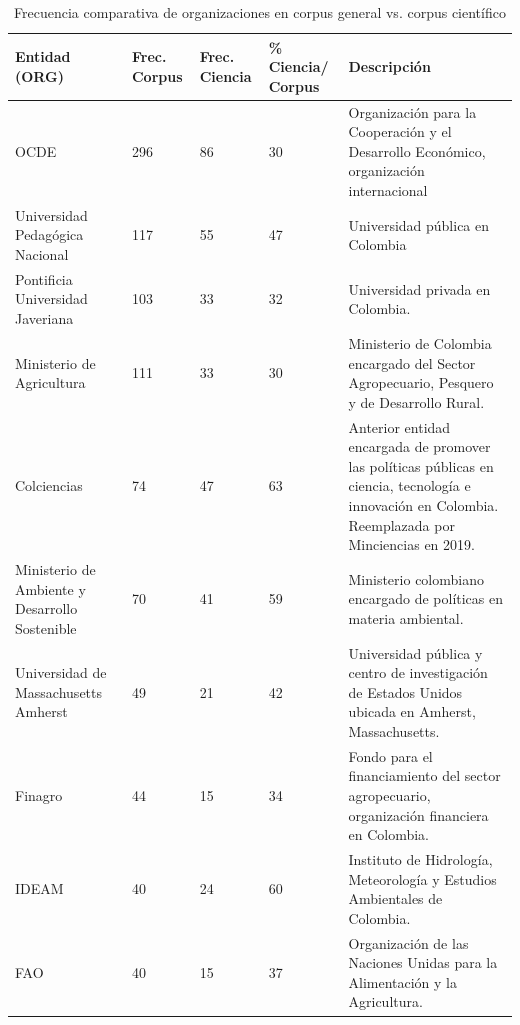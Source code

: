\documentclass[11pt,a4paper]{article}
\begin{document}
		\begin{table}[H]
		\centering
		\caption{Frecuencia comparativa de organizaciones en corpus general vs. corpus científico}
		\label{tab:ents_org}
		\footnotesize 
		
		\begin{tabular}{p{3cm}P{2.2cm}P{2.2cm}P{2.2cm}p{5cm}}
			\toprule
			\textbf{Entidad (ORG)} & 
			\textbf{Frec. Corpus} & 
			\textbf{Frec. Ciencia} & 
			\textbf{\% Ciencia/ Corpus} & 
			\textbf{Descripción} \\
			\midrule
			OCDE & 296 & 86 & 30 & Organización para la Cooperación y el Desarrollo Económico, organización internacional
			 \\
			Universidad Pedagógica Nacional & 117 & 55 & 47 & Universidad pública en Colombia \\
			Pontificia Universidad Javeriana & 103 & 33 & 32 & Universidad privada en Colombia. \\
			Ministerio de Agricultura & 111 & 33 & 30 & Ministerio de Colombia encargado del Sector Agropecuario, Pesquero y de Desarrollo Rural.  \\
			Colciencias & 74 & 47 & 63 & Anterior entidad encargada de promover las políticas públicas en ciencia, tecnología e innovación en Colombia. Reemplazada por Minciencias en 2019. \\
			Ministerio de Ambiente y Desarrollo Sostenible & 70 & 41 & 59 & Ministerio colombiano encargado de políticas en materia ambiental. \\
			Universidad de Massachusetts Amherst & 49 & 21 & 42 & Universidad pública y centro de investigación de Estados Unidos ubicada en Amherst, Massachusetts. \\
			Finagro & 44 & 15 & 34 & Fondo para el financiamiento del sector agropecuario, organización financiera en Colombia. \\
			IDEAM & 40 & 24 & 60 & Instituto de Hidrología, Meteorología y Estudios Ambientales de Colombia. \\
			FAO & 40 & 15 & 37 & Organización de las Naciones Unidas para la Alimentación y la Agricultura.\\
			
			\bottomrule
		\end{tabular}
	\end{table}
	
\end{document}
